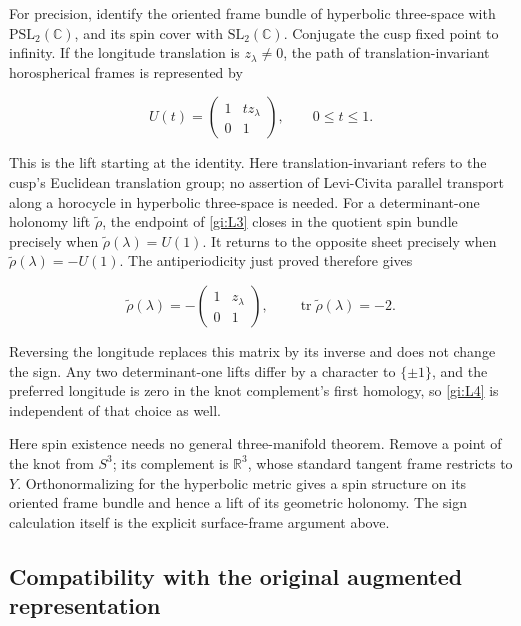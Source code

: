 For precision, identify the oriented frame bundle of hyperbolic
three-space with \(\mathrm{PSL}_2(\mathbb C)\), and its
spin cover with \(\mathrm{SL}_2(\mathbb C)\).
Conjugate the cusp fixed point to infinity. If the longitude
translation is \(z_\lambda\ne0\), the path of translation-invariant
horospherical frames is represented by

\begin{equation}\label{gi:L3}
U(t)=
 \begin{pmatrix}1&t z_\lambda\\0&1\end{pmatrix},
                         \qquad 0\le t\le1.
\end{equation}

This is the lift starting at the identity.
Here translation-invariant refers to the cusp's Euclidean translation
group; no assertion of Levi-Civita parallel transport along a
horocycle in hyperbolic three-space is needed.
For a determinant-one holonomy lift \(\widetilde\rho\),
the endpoint of \eqref{gi:L3} closes in the quotient spin bundle precisely
when
\(\widetilde\rho(\lambda)=U(1)\).
It returns to the opposite sheet precisely when
\(\widetilde\rho(\lambda)=-U(1)\).
The antiperiodicity just proved therefore gives

\begin{equation}\label{gi:L4}
\boxed{\displaystyle
 \widetilde\rho(\lambda)=
       -\begin{pmatrix}1&z_\lambda\\0&1\end{pmatrix},
 \qquad
 \operatorname{tr}\widetilde\rho(\lambda)=-2.}
\end{equation}

Reversing the longitude replaces this matrix by its inverse and
does not change the sign. Any two determinant-one lifts differ
by a character to \(\{\pm1\}\), and the preferred longitude
is zero in the knot complement's first homology, so \eqref{gi:L4} is
independent of that choice as well.

Here spin existence needs no general three-manifold theorem.
Remove a point of the knot from \(S^3\); its complement is
\(\mathbb R^3\), whose standard tangent frame restricts to \(Y\).
Orthonormalizing for the hyperbolic metric gives a spin structure
on its oriented frame bundle and hence a lift of its geometric
holonomy. The sign calculation itself is the explicit surface-frame
argument above.

\subsection{Compatibility with the original augmented representation}\label{gi:compatibility-with-the-original-augmented-representation}

